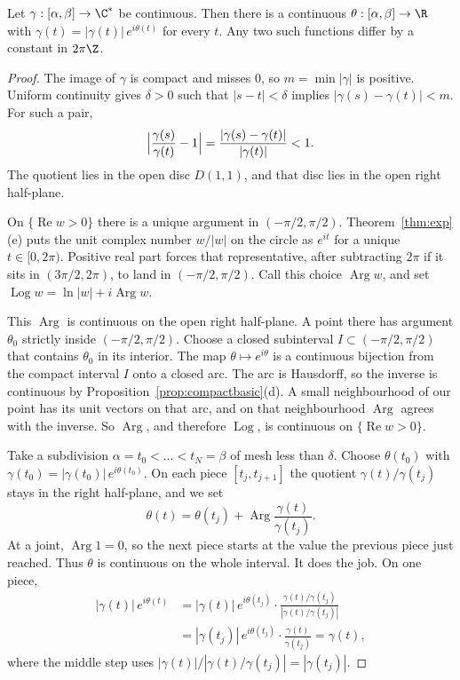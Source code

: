 \begin{lemma}\label{lem:lift}
Let $\gamma:[\alpha,\beta]\to\C^*$ be continuous. Then there is a continuous $\theta:[\alpha,\beta]\to\R$ with $\gamma(t)=|\gamma(t)|\,e^{i\theta(t)}$ for every $t$. Any two such functions differ by a constant in $2\pi\Z$.
\end{lemma}
\begin{proof}
The image of $\gamma$ is compact and misses $0$, so $m=\min|\gamma|$ is positive. Uniform continuity gives $\delta>0$ such that $|s-t|<\delta$ implies $|\gamma(s)-\gamma(t)|<m$. For such a pair,
\[
\Bigl|\frac{\gamma(s)}{\gamma(t)}-1\Bigr|=\frac{|\gamma(s)-\gamma(t)|}{|\gamma(t)|}<1.
\]
The quotient lies in the open disc $D(1,1)$, and that disc lies in the open right half-plane.

On $\{\operatorname{Re} w>0\}$ there is a unique argument in $(-\pi/2,\pi/2)$. Theorem~\ref{thm:exp}(e) puts the unit complex number $w/|w|$ on the circle as $e^{it}$ for a unique $t\in[0,2\pi)$. Positive real part forces that representative, after subtracting $2\pi$ if it sits in $(3\pi/2,2\pi)$, to land in $(-\pi/2,\pi/2)$. Call this choice $\operatorname{Arg} w$, and set $\operatorname{Log} w=\ln|w|+i\operatorname{Arg} w$.

This $\operatorname{Arg}$ is continuous on the open right half-plane. A point there has argument $\theta_0$ strictly inside $(-\pi/2,\pi/2)$. Choose a closed subinterval $I\subset(-\pi/2,\pi/2)$ that contains $\theta_0$ in its interior. The map $\theta\mapsto e^{i\theta}$ is a continuous bijection from the compact interval $I$ onto a closed arc. The arc is Hausdorff, so the inverse is continuous by Proposition~\ref{prop:compactbasic}(d). A small neighbourhood of our point has its unit vectors on that arc, and on that neighbourhood $\operatorname{Arg}$ agrees with the inverse. So $\operatorname{Arg}$, and therefore $\operatorname{Log}$, is continuous on $\{\operatorname{Re} w>0\}$.

Take a subdivision $\alpha=t_0<\dots<t_N=\beta$ of mesh less than $\delta$. Choose $\theta(t_0)$ with $\gamma(t_0)=|\gamma(t_0)|\,e^{i\theta(t_0)}$. On each piece $[t_j,t_{j+1}]$ the quotient $\gamma(t)/\gamma(t_j)$ stays in the right half-plane, and we set
\[
\theta(t)=\theta(t_j)+\operatorname{Arg}\frac{\gamma(t)}{\gamma(t_j)}.
\]
At a joint, $\operatorname{Arg} 1=0$, so the next piece starts at the value the previous piece just reached. Thus $\theta$ is continuous on the whole interval. It does the job. On one piece,
\[
\begin{aligned}
|\gamma(t)|\,e^{i\theta(t)}
&=|\gamma(t)|\,e^{i\theta(t_j)}\cdot\frac{\gamma(t)/\gamma(t_j)}{|\gamma(t)/\gamma(t_j)|}\\
&=|\gamma(t_j)|\,e^{i\theta(t_j)}\cdot\frac{\gamma(t)}{\gamma(t_j)}
=\gamma(t),
\end{aligned}
\]
where the middle step uses $|\gamma(t)|/|\gamma(t)/\gamma(t_j)|=|\gamma(t_j)|$.


\end{proof}
